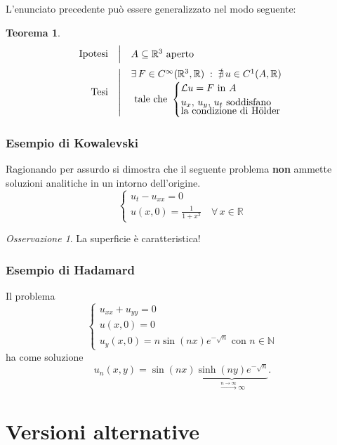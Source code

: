 \documentclass[serif,notheorems]{beamer}
\makeatletter
\newenvironment{ipotesi}%
{\quad\left|\quad\def\arraystretch{1.2}\begin{array}{@{}l@{}}}%
{\end{array}\right.}
\newcommand{\hpth}[2]
{
\begin{align*}
\quad
\text{Ipotesi}
&\begin{ipotesi}
#1
\end{ipotesi}\\
\text{Tesi}
&\begin{ipotesi}
#2
\end{ipotesi}
\end{align*}
}
\theoremstyle{definition} %
\newtheorem{theorem}{Teorema}[section] %
\theoremstyle{remark}
\newtheorem*{remark}{Osservazione}
\makeatother
\begin{document}
\begin{frame}
L'enunciato precedente può essere generalizzato nel modo seguente:
\begin{theorem}
\hpth{
A \subseteq \mathbb{R}^3 \text{ aperto }\\
}
{
\exists \, F \in C^{\infty}(\mathbb{R}^3,\mathbb{R}) \; : \; \nexists \, u \in C^1(A,\mathbb{R}) \\ \text{ tale che }
\begin{cases}
\mathcal{L}u=F \text{ in } A\\
\vspace{-2mm}
u_x,\,u_y,\,u_t \text{ soddisfano} \\
\text {la condizione di Hölder }
\end{cases}
}
\end{theorem}
\end{frame}

\begin{frame}
\frametitle{Esempio di Kowalevski} 
Ragionando per assurdo si dimostra che il seguente problema \textbf{non} ammette soluzioni analitiche in un intorno dell’origine.
\begin{equation*}
\begin{cases}
u_t-u_{xx}=0\\
u(x,0)=\frac{1}{1+x^2} \quad \forall \, x \in \mathbb{R}
\end{cases}
\end{equation*}
\begin{remark}
La superficie è caratteristica!
\end{remark}
\end{frame}

\begin{frame}
\frametitle{Esempio di Hadamard}
Il problema
\begin{equation*}
\begin{cases}
u_{xx}+u_{yy}=0\\
u(x,0)=0\\ 
u_y(x,0)=n\sin(nx)e^{-\sqrt{n}} \text{ con } n\in\mathbb{N}
\end{cases}
\end{equation*}
ha come soluzione
$$u_n(x,y)=\sin(nx) \underbrace{\sinh(ny)e^{-\sqrt{n}}}_{\xrightarrow{n\rightarrow\infty} \infty}.$$
\end{frame}



\section{Versioni alternative}
\end{document}
